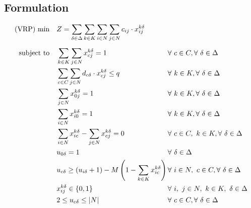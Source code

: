 \documentclass[preprint,review,12pt]{elsarticle}
\begin{document}
\subsection{Formulation}

\begin{align}
	\text{(VRP) min} \quad      & Z = \sum\limits_{\delta\in \Delta} \sum\limits_{k\in K}\sum\limits_{i\in N}\sum\limits_{j\in N} c_{ij} \cdot x_{ij}^{k\delta}    && \label{PCVRP_FObj}    \\[5pt]
	\noindent \text{subject to} \quad & \sum\limits_{k \in K}\sum\limits_{j \in N} x_{cj}^{k\delta} = 1                    && \text{\hspace{-1cm}} \forall \ c \in C, \forall \ \delta \in \Delta \label{PCVRP_Service} \\
	& \sum\limits_{c \in C}\sum\limits_{j \in N}d_{c\delta} \cdot x_{cj}^{k\delta} \leq q                 && \text{\hspace{-1cm}} \forall \ k \in K, \forall \ \delta \in \Delta  \label{PCVRP_Capacity} \\
	& \sum\limits_{j \in N}x_{0j}^{k\delta} = 1                                             && \text{\hspace{-1cm}} \forall \ k \in K, \forall \ \delta \in \Delta \label{PCVRP_StartRoute} \\
	& \sum\limits_{i \in N}x_{i0}^{k\delta} = 1                                             && \text{\hspace{-1cm}} \forall \ k \in K, \forall \ \delta \in \Delta \label{PCVRP_EndRoute} \\
	& \sum\limits_{i \in N}x_{ic}^{k\delta} - \sum\limits_{j \in N}x_{cj}^{k\delta} = 0             && \text{\hspace{-1cm}} \forall \ c \in C,\ k \in K, \forall \ \delta \in \Delta \label{PCVRP_Balance} \\
	& u_{0\delta} = 1                                                                       && \text{\hspace{-1cm}} \forall \ \delta \in \Delta \label{PCVRP_InitialU}\\
	& u_{c\delta} \geq (u_{i\delta} + 1) - M \left(1 - \sum\limits_{k \in K}x_{ic}^{k\delta} \right) \qquad && \text{\hspace{-1cm}} \forall \ i \in N,\ c \in C, \forall \ \delta \in \Delta \label{PCVRP_OrderU}\\
	& x_{ij}^{k\delta} \in\{0,1\}                                                         && \text{\hspace{-1cm}} \forall \ i, \ j \in N,\ k \in K,\ \delta \in \Delta \label{PCVRP_DomainX}\\
	& 2 \leq u_{c\delta} \leq |N|                                                           && \text{\hspace{-1cm}} \forall \ c \in C, \forall \ \delta \in \Delta \label{PCVRP_DomainU}
\end{align}
\end{document}
